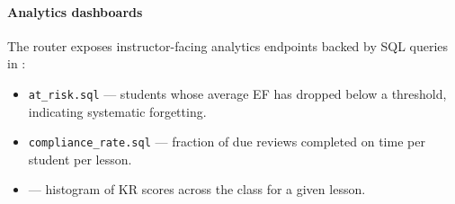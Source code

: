 \paragraph{Analytics dashboards}
The  router exposes instructor-facing analytics endpoints backed by SQL queries in :
\begin{itemize}
    \item \texttt{at\_risk.sql} — students whose average EF has dropped below a threshold, indicating systematic forgetting.
    \item \texttt{compliance\_rate.sql} — fraction of due reviews completed on time per student per lesson.
    \item {} — histogram of KR scores across the class for a given lesson.
\end{itemize}
